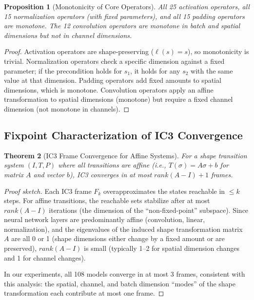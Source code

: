 \documentclass[10pt]{article}
\theoremstyle{plain}
\newtheorem{theorem}{Theorem}[section]
\newtheorem{proposition}[theorem]{Proposition}
\theoremstyle{definition}
\theoremstyle{remark}
\begin{document}
\begin{proposition}[Monotonicity of Core Operators]
All 25 activation operators, all 15 normalization operators (with
fixed parameters), and all 15 padding operators are monotone.  The
12 convolution operators are monotone in batch and spatial dimensions
but not in channel dimensions.
\end{proposition}

\begin{proof}
Activation operators are shape-preserving ($\ell(s) = s$), so
monotonicity is trivial.  Normalization operators check a specific
dimension against a fixed parameter; if the precondition holds for
$s_1$, it holds for any $s_2$ with the same value at that dimension.
Padding operators add fixed amounts to spatial dimensions, which is
monotone.  Convolution operators apply an affine transformation to
spatial dimensions (monotone) but require a fixed channel dimension
(not monotone in channels).
\end{proof}

\subsection{Fixpoint Characterization of IC3 Convergence}

\begin{theorem}[IC3 Frame Convergence for Affine Systems]\label{thm:ic3-convergence}
For a shape transition system $(I, T, P)$ where all transitions
are affine (i.e., $T(\sigma) = A\sigma + b$ for matrix $A$ and
vector $b$), IC3 converges in at most $\mathit{rank}(A-I) + 1$
frames.
\end{theorem}

\begin{proof}[Proof sketch]
Each IC3 frame $F_k$ overapproximates the states reachable in $\leq k$
steps.  For affine transitions, the reachable sets stabilize after
at most $\mathit{rank}(A-I)$ iterations (the dimension of the
``non-fixed-point'' subspace).  Since neural network layers are
predominantly affine (convolution, linear, normalization), and the
eigenvalues of the induced shape transformation matrix $A$ are all
0 or 1 (shape dimensions either change by a fixed amount or are
preserved), $\mathit{rank}(A-I)$ is small (typically 1--2 for
spatial dimension changes and 1 for channel changes).

In our experiments, all 108 models converge in at most 3 frames,
consistent with this analysis: the spatial, channel, and batch
dimension ``modes'' of the shape transformation each contribute
at most one frame.
\end{proof}
\end{document}
